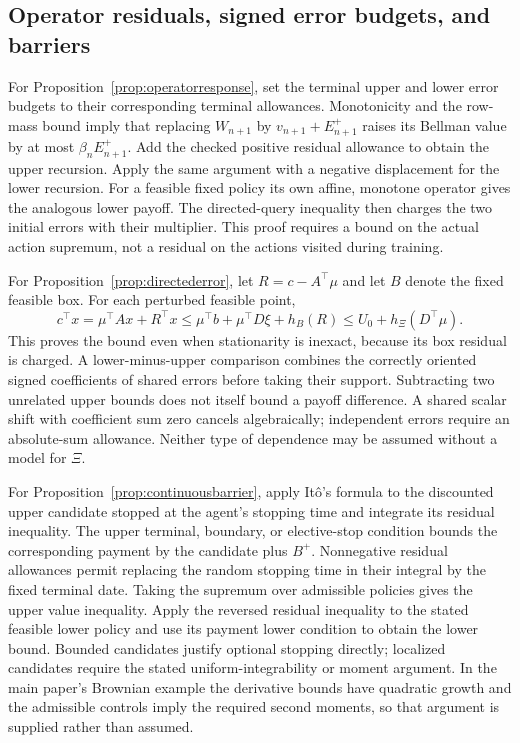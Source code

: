 \subsection{Operator residuals, signed error budgets, and barriers}
For Proposition~\ref{prop:operatorresponse}, set the terminal upper and lower error budgets to their corresponding terminal allowances. Monotonicity and the row-mass bound imply that replacing $W_{n+1}$ by $v_{n+1}+E^+_{n+1}$ raises its Bellman value by at most $\beta_nE^+_{n+1}$. Add the checked positive residual allowance to obtain the upper recursion. Apply the same argument with a negative displacement for the lower recursion. For a feasible fixed policy its own affine, monotone operator gives the analogous lower payoff. The directed-query inequality then charges the two initial errors with their multiplier. This proof requires a bound on the actual action supremum, not a residual on the actions visited during training.

For Proposition~\ref{prop:directederror}, let $R=c-A^\top\mu$ and let $B$ denote the fixed feasible box. For each perturbed feasible point,
\[
 c^\top x=\mu^\top Ax+R^\top x
 \leq\mu^\top b+\mu^\top D\xi+h_B(R)
 \leq U_0+h_\Xi(D^\top\mu).
\]
This proves the bound even when stationarity is inexact, because its box residual is charged. A lower-minus-upper comparison combines the correctly oriented signed coefficients of shared errors before taking their support. Subtracting two unrelated upper bounds does not itself bound a payoff difference. A shared scalar shift with coefficient sum zero cancels algebraically; independent errors require an absolute-sum allowance. Neither type of dependence may be assumed without a model for $\Xi$.

For Proposition~\ref{prop:continuousbarrier}, apply It\^o's formula to the discounted upper candidate stopped at the agent's stopping time and integrate its residual inequality. The upper terminal, boundary, or elective-stop condition bounds the corresponding payment by the candidate plus $B^+$. Nonnegative residual allowances permit replacing the random stopping time in their integral by the fixed terminal date. Taking the supremum over admissible policies gives the upper value inequality. Apply the reversed residual inequality to the stated feasible lower policy and use its payment lower condition to obtain the lower bound. Bounded candidates justify optional stopping directly; localized candidates require the stated uniform-integrability or moment argument. In the main paper's Brownian example the derivative bounds have quadratic growth and the admissible controls imply the required second moments, so that argument is supplied rather than assumed.

